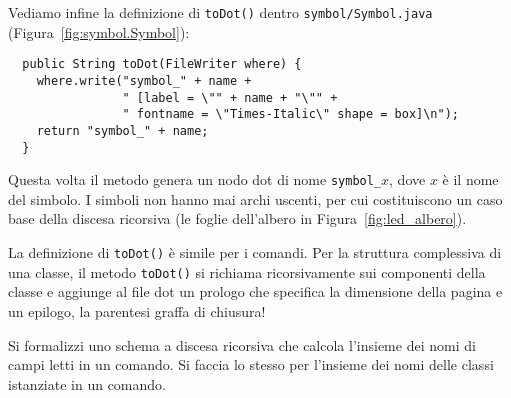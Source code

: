 Vediamo infine la definizione di \texttt{toDot()} dentro
\texttt{symbol/Symbol.java} (Figura~\ref{fig:symbol.Symbol}):
%
\begin{verbatim}
  public String toDot(FileWriter where) {
    where.write("symbol_" + name +
                " [label = \"" + name + "\"" +
                " fontname = \"Times-Italic\" shape = box]\n");
    return "symbol_" + name;
  }
\end{verbatim}
%
Questa volta il metodo genera un nodo dot di nome \texttt{symbol\_}$x$,
dove $x$ \`e il nome del simbolo. I simboli non hanno mai archi uscenti, per
cui costituiscono un caso base della discesa ricorsiva (le foglie
dell'albero in Figura~\ref{fig:led_albero}).

La definizione di \texttt{toDot()} \`e simile per i comandi. Per la
struttura complessiva di una classe, il metodo \texttt{toDot()}
si richiama ricorsivamente sui componenti della classe e aggiunge al file
dot un prologo che specifica la dimensione della pagina e un epilogo, \cioe
la parentesi graffa di chiusura!
%
%
\begin{exercise}\label{ex:descent_fields}
Si formalizzi uno schema a discesa ricorsiva che calcola l'insieme dei
nomi di campi letti in un comando. Si faccia lo stesso per l'insieme
dei nomi delle classi istanziate in un comando.
\end{exercise}
%

